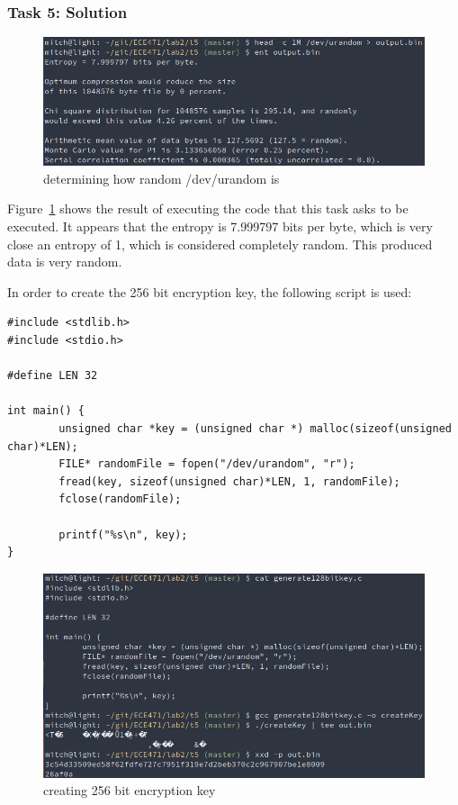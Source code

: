 \documentclass[12pt]{article}
\begin{document}
\subsubsection{Task 5: Solution}

\begin{figure}[H]
    \begin{center}
        \includegraphics[scale=0.6]{t5p0.png}
    \end{center}{}
    \caption{determining how random /dev/urandom is}
    \label{fig:t5p0}
\end{figure}

Figure~\ref{fig:t5p0} shows the result of executing the code that this task asks to be executed. It appears that the entropy is 7.999797 bits per byte, which is very close an entropy of 1, which is considered completely random. This produced data is very random.

In order to create the 256 bit encryption key, the following script is used:
\begin{verbatim}
#include <stdlib.h>
#include <stdio.h>

#define LEN 32

int main() {
        unsigned char *key = (unsigned char *) malloc(sizeof(unsigned char)*LEN);
        FILE* randomFile = fopen("/dev/urandom", "r");
        fread(key, sizeof(unsigned char)*LEN, 1, randomFile);
        fclose(randomFile);

        printf("%s\n", key);
}
\end{verbatim}

\begin{figure}[H]
    \begin{center}
        \includegraphics[scale=0.6]{t5p2.png}
    \end{center}{}
    \caption{creating 256 bit encryption key}
    \label{fig:t5p2}
\end{figure}
\end{document}
